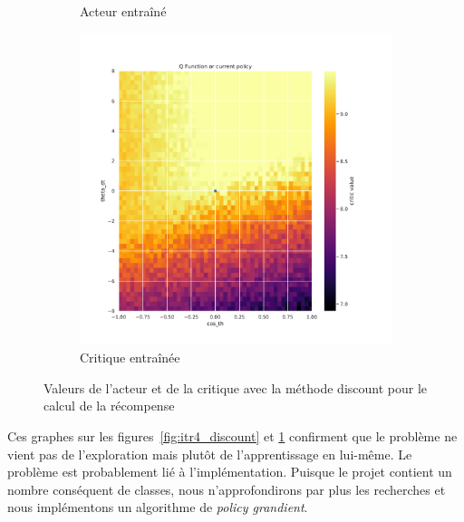 \begin{figure}[H]
\begin{subfigure}{0.3\textwidth}
        \caption{Acteur entraîné}
    \end{subfigure}
    \begin{subfigure}{0.3\textwidth}
        \includegraphics[width=\textwidth]{figures/iteration4/0_critic_normalize_post_Pendulum-v0.pdf}
        \caption{Critique entraînée}
    \end{subfigure}
    \caption{Valeurs de l'acteur et de la critique avec la méthode discount pour le calcul de la récompense}
    \label{fig:itr4_normalize}
\end{figure}

Ces graphes sur les figures~\ref{fig:itr4_discount} et \ref{fig:itr4_normalize} confirment que le problème ne vient pas de l'exploration mais plutôt de l'apprentissage en lui-même. Le problème est probablement lié à l'implémentation. Puisque le projet contient un nombre conséquent de classes, nous n'approfondirons par plus les recherches et nous implémentons un algorithme de \emph{policy grandient}.